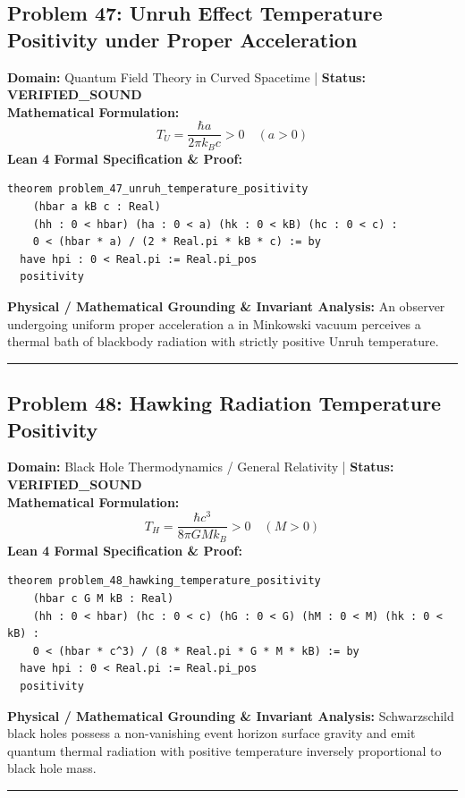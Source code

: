 \documentclass[10pt,a4paper]{article}
\begin{document}
\subsection*{Problem 47: Unruh Effect Temperature Positivity under Proper Acceleration}
\textbf{Domain:} Quantum Field Theory in Curved Spacetime \quad | \quad \textbf{Status:} \textcolor{green!70!black}{\textbf{VERIFIED\_SOUND}}\\
\textbf{Mathematical Formulation:}
\begin{equation*}
  T_U = \frac{\hbar a}{2\pi k_B c} > 0 \quad (a > 0)
\end{equation*}
\textbf{Lean 4 Formal Specification \& Proof:}
\begin{lstlisting}
theorem problem_47_unruh_temperature_positivity
    (hbar a kB c : Real)
    (hh : 0 < hbar) (ha : 0 < a) (hk : 0 < kB) (hc : 0 < c) :
    0 < (hbar * a) / (2 * Real.pi * kB * c) := by
  have hpi : 0 < Real.pi := Real.pi_pos
  positivity
\end{lstlisting}
\textbf{Physical / Mathematical Grounding \& Invariant Analysis:}
An observer undergoing uniform proper acceleration a in Minkowski vacuum perceives a thermal bath of blackbody radiation with strictly positive Unruh temperature.
\vspace{0.8em}\hrule\vspace{0.8em}
\subsection*{Problem 48: Hawking Radiation Temperature Positivity}
\textbf{Domain:} Black Hole Thermodynamics / General Relativity \quad | \quad \textbf{Status:} \textcolor{green!70!black}{\textbf{VERIFIED\_SOUND}}\\
\textbf{Mathematical Formulation:}
\begin{equation*}
  T_H = \frac{\hbar c^3}{8\pi G M k_B} > 0 \quad (M > 0)
\end{equation*}
\textbf{Lean 4 Formal Specification \& Proof:}
\begin{lstlisting}
theorem problem_48_hawking_temperature_positivity
    (hbar c G M kB : Real)
    (hh : 0 < hbar) (hc : 0 < c) (hG : 0 < G) (hM : 0 < M) (hk : 0 < kB) :
    0 < (hbar * c^3) / (8 * Real.pi * G * M * kB) := by
  have hpi : 0 < Real.pi := Real.pi_pos
  positivity
\end{lstlisting}
\textbf{Physical / Mathematical Grounding \& Invariant Analysis:}
Schwarzschild black holes possess a non-vanishing event horizon surface gravity and emit quantum thermal radiation with positive temperature inversely proportional to black hole mass.
\vspace{0.8em}\hrule\vspace{0.8em}
\end{document}
